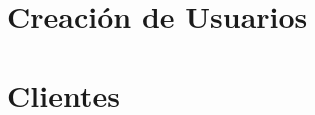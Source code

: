 \documentclass[journal]{IEEEtran}
\begin{document}
\clearpage{}

\section{Creación de Usuarios}\label{sec:cusuarios}



\clearpage{}

\section{Clientes}\label{sec:clientes}



\newpage

\listoffigures
{}
\listoflistings{}
\printglossary{}
\printglossary[type=\acronymtype]
\end{document}
